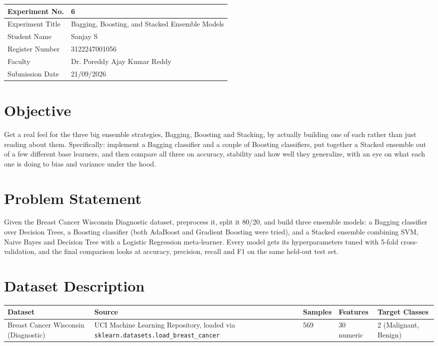 \documentclass[12pt,a4paper]{article}
\begin{document}
\begin{tabular}{|p{4cm}|p{11cm}|}
\hline
Experiment No. & 6 \\ \hline
Experiment Title & Bagging, Boosting, and Stacked Ensemble Models\footnotemark \\ \hline
Student Name & Sanjay S \\ \hline
Register Number & 3122247001056 \\ \hline
Faculty & Dr. Poreddy Ajay Kumar Reddy \\ \hline
Submission Date & 21/09/2026 \\ \hline
\end{tabular}

\section{Objective}
Get a real feel for the three big ensemble strategies, Bagging, Boosting and Stacking, by actually
building one of each rather than just reading about them. Specifically: implement a Bagging classifier
and a couple of Boosting classifiers, put together a Stacked ensemble out of a few different base
learners, and then compare all three on accuracy, stability and how well they generalize, with an eye
on what each one is doing to bias and variance under the hood.

\section{Problem Statement}
Given the Breast Cancer Wisconsin Diagnostic dataset, preprocess it, split it 80/20, and build three
ensemble models: a Bagging classifier over Decision Trees, a Boosting classifier (both AdaBoost and
Gradient Boosting were tried), and a Stacked ensemble combining SVM, Naive Bayes and Decision Tree with
a Logistic Regression meta-learner. Every model gets its hyperparameters tuned with 5-fold
cross-validation, and the final comparison looks at accuracy, precision, recall and F1 on the same
held-out test set.

\section{Dataset Description}
\begin{longtable}{|p{4.2cm}|p{4.5cm}|p{1.6cm}|p{1.8cm}|p{2cm}|}
\hline
\textbf{Dataset} & \textbf{Source} & \textbf{Samples} & \textbf{Features} & \textbf{Target Classes} \\ \hline
Breast Cancer Wisconsin (Diagnostic) & UCI Machine Learning Repository, loaded via
\texttt{sklearn.datasets.load\_breast\_cancer} & 569 & 30 numeric & 2 (Malignant, Benign) \\ \hline
\end{longtable}
\end{document}
